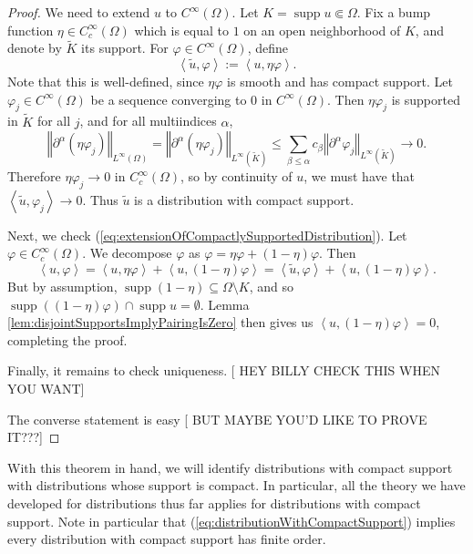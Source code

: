 \documentclass{book}
\renewcommand{\phi}{\varphi}
\newcommand{\norm}[1]{\left\Vert {#1} \right\Vert}
\newcommand{\angles}[1]{\left\langle {#1} \right\rangle}
\DeclareMathOperator{\supp}{supp}
\theoremstyle{definition}
\theoremstyle{remark}
\numberwithin{equation}{chapter}
\begin{document}
\begin{proof}
    We need to extend $u$ to $C^\infty(\Omega)$. Let $K = \supp{u} \Subset \Omega$. Fix a bump function $\eta \in C_c^\infty(\Omega)$ which is equal to $1$ on an open neighborhood of $K$, and denote by $\widetilde{K}$ its support. For $\phi \in C^\infty(\Omega)$, define 
    \begin{equation}
        \angles{ \widetilde{u},\phi } := \angles{ u, \eta\phi }.
    \end{equation}
    Note that this is well-defined, since $\eta\phi$ is smooth and has compact support. Let $\phi_j \in C^\infty(\Omega)$ be a sequence converging to $0$ in $C^\infty(\Omega)$. Then $\eta\phi_j$ is supported in $\widetilde{K}$ for all $j$, and for all multiindices $\alpha$,
    \begin{equation}
        \norm{ \partial^\alpha(\eta\phi_j) }_{L^\infty(\Omega)} =           \norm{ \partial^\alpha(\eta\phi_j) }_{L^\infty(\widetilde{K})}
                                                                \leq        \sum_{\beta \leq \alpha} c_\beta \norm{ \partial^\alpha \phi_j }_{L^\infty(\widetilde{K})}
                                                                \rightarrow 0.
    \end{equation}
    Therefore $\eta\phi_j \rightarrow 0$ in $C^\infty_c(\Omega)$, so by continuity of $u$, we must have that $\angles{ \widetilde{u},\phi_j } \rightarrow 0$. Thus $\widetilde{u}$ is a distribution with compact support.
    
    Next, we check (\ref{eq:extensionOfCompactlySupportedDistribution}). Let $\phi \in C_c^\infty(\Omega)$. We decompose $\phi$ as $\phi = \eta\phi + (1-\eta)\phi$. Then 
    \begin{equation}
        \angles{ u,\phi } = \angles{ u,\eta\phi } + \angles{ u,(1-\eta)\phi } = \angles{ \widetilde{u},\phi } + \angles{ u,(1-\eta)\phi }.
    \end{equation}
    But by assumption, $\supp(1-\eta) \subseteq \Omega \setminus K$, and so $\supp((1-\eta)\phi) \cap \supp{u} = \emptyset$. Lemma \ref{lem:disjointSupportsImplyPairingIsZero} then gives us $\angles{ u,(1-\eta)\phi } = 0$, completing the proof.

    Finally, it remains to check uniqueness. [{\color{red} HEY BILLY CHECK THIS WHEN YOU WANT}]

    The converse statement is easy [{\color{red} BUT MAYBE YOU'D LIKE TO PROVE IT???}]
\end{proof}
With this theorem in hand, we will identify distributions with compact support with distributions whose support is compact. In particular, all the theory we have developed for distributions thus far applies for distributions with compact support. Note in particular that (\ref{eq:distributionWithCompactSupport}) implies every distribution with compact support has finite order.
 
\end{document}
